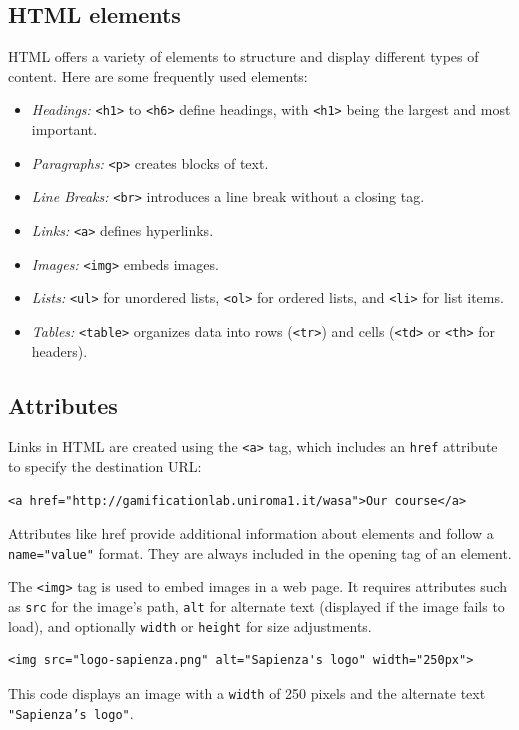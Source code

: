 \subsection*{HTML elements}
HTML offers a variety of elements to structure and display different types of content. Here are some frequently used elements:
\begin{itemize}
    \item \textit{Headings:} \texttt{<h1>} to \texttt{<h6>} define headings, with \texttt{<h1>} being the largest and most important.
    \item \textit{Paragraphs:} \texttt{<p>} creates blocks of text.
    \item \textit{Line Breaks:} \texttt{<br>} introduces a line break without a closing tag.
    \item \textit{Links:} \texttt{<a>} defines hyperlinks.
    \item \textit{Images:} \texttt{<img>} embeds images.
    \item \textit{Lists:} \texttt{<ul>} for unordered lists, \texttt{<ol>} for ordered lists, and \texttt{<li>} for list items.
    \item \textit{Tables:} \texttt{<table>} organizes data into rows (\texttt{<tr>}) and cells (\texttt{<td>} or \texttt{<th>} for headers).
\end{itemize}

\subsection*{Attributes}
Links in HTML are created using the \texttt{<a>} tag, which includes an \texttt{href} attribute to specify the destination URL:
\begin{verbatim}
<a href="http://gamificationlab.uniroma1.it/wasa">Our course</a>
\end{verbatim}
Attributes like href provide additional information about elements and follow a \texttt{name="value"} format. They are always included in the opening tag of an element.

The \texttt{<img>} tag is used to embed images in a web page. It requires attributes such as \texttt{src} for the image’s path, \texttt{alt} for alternate text (displayed if the image fails to load), and optionally \texttt{width} or \texttt{height} for size adjustments.
\begin{verbatim}
<img src="logo-sapienza.png" alt="Sapienza's logo" width="250px">
\end{verbatim}
This code displays an image with a \texttt{width} of 250 pixels and the alternate text \texttt{"Sapienza's logo"}.

